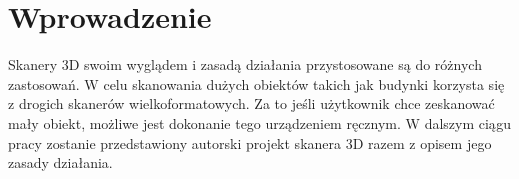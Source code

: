 \section{Wprowadzenie}
Skanery 3D swoim wyglądem i zasadą działania przystosowane są do różnych zastosowań. W celu skanowania dużych obiektów takich jak budynki korzysta się z drogich skanerów wielkoformatowych. Za to jeśli użytkownik chce zeskanować mały obiekt, możliwe jest dokonanie tego urządzeniem ręcznym. W dalszym ciągu pracy zostanie przedstawiony autorski projekt skanera 3D razem z opisem jego zasady działania.
